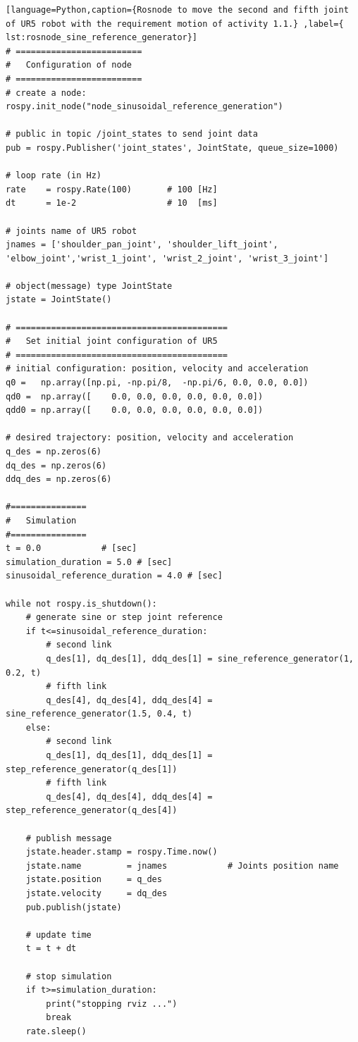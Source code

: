 \begin{lstlisting}[language=Python,caption={Rosnode to move the second and fifth joint of UR5 robot with the requirement motion of activity 1.1.} ,label={ lst:rosnode_sine_reference_generator}]
# =========================
#   Configuration of node
# =========================
# create a node: 
rospy.init_node("node_sinusoidal_reference_generation")

# public in topic /joint_states	to send joint data	
pub = rospy.Publisher('joint_states', JointState, queue_size=1000)

# loop rate (in Hz)
rate 	= rospy.Rate(100)		# 100 [Hz]
dt 		= 1e-2					# 10  [ms]

# joints name of UR5 robot
jnames = ['shoulder_pan_joint', 'shoulder_lift_joint', 'elbow_joint','wrist_1_joint', 'wrist_2_joint', 'wrist_3_joint']

# object(message) type JointState
jstate = JointState()

# ==========================================
#   Set initial joint configuration of UR5
# ==========================================
# initial configuration: position, velocity and acceleration 
q0 =   np.array([np.pi, -np.pi/8,  -np.pi/6, 0.0, 0.0, 0.0])
qd0 =  np.array([    0.0, 0.0, 0.0, 0.0, 0.0, 0.0])
qdd0 = np.array([    0.0, 0.0, 0.0, 0.0, 0.0, 0.0]) 

# desired trajectory: position, velocity and acceleration
q_des = np.zeros(6)
dq_des = np.zeros(6)
ddq_des = np.zeros(6)

#===============
#   Simulation
#===============
t = 0.0            # [sec] 
simulation_duration = 5.0 # [sec]
sinusoidal_reference_duration = 4.0 # [sec]

while not rospy.is_shutdown():
    # generate sine or step joint reference
    if t<=sinusoidal_reference_duration:
        # second link
        q_des[1], dq_des[1], ddq_des[1] = sine_reference_generator(1, 0.2, t)
        # fifth link
        q_des[4], dq_des[4], ddq_des[4] = sine_reference_generator(1.5, 0.4, t)
    else:
        # second link
        q_des[1], dq_des[1], ddq_des[1] = step_reference_generator(q_des[1])
        # fifth link
        q_des[4], dq_des[4], ddq_des[4] = step_reference_generator(q_des[4])

    # publish message
    jstate.header.stamp = rospy.Time.now()
    jstate.name 		= jnames			# Joints position name
    jstate.position 	= q_des
    jstate.velocity 	= dq_des
    pub.publish(jstate)

    # update time
    t = t + dt
    
    # stop simulation
    if t>=simulation_duration:
        print("stopping rviz ...")
        break
    rate.sleep()
\end{lstlisting}


